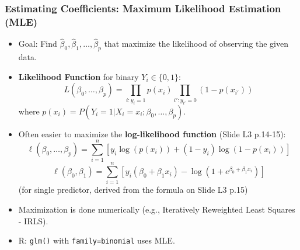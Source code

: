\documentclass[12pt,a4paper]{article}
\newcommand{\Rfunction}[1]{\texttt{#1()}} %
\newcommand{\Rcode}[1]{\texttt{#1}} %
\begin{document}
\begin{itemize}
    \subsubsection{Estimating Coefficients: Maximum Likelihood Estimation (MLE) }
        \begin{itemize}
            \item Goal: Find $\hat{\beta}_0, \hat{\beta}_1, \dots, \hat{\beta}_p$ that maximize the likelihood of observing the given data.
            \item \textbf{Likelihood Function} for binary $Y_i \in \{0,1\}$:
                $$ L(\beta_0, \dots, \beta_p) = \prod_{i: y_i=1} p(x_i) \prod_{i': y_{i'}=0} (1 - p(x_{i'})) $$
                where $p(x_i) = P(Y_i=1 | X_i=x_i; \beta_0, \dots, \beta_p)$.
            \item Often easier to maximize the \textbf{log-likelihood function} (Slide L3 p.14-15):
                $$ \ell(\beta_0, \dots, \beta_p) = \sum_{i=1}^n \left[ y_i \log(p(x_i)) + (1-y_i) \log(1-p(x_i)) \right] $$
                $$ \ell(\beta_0, \beta_1) = \sum_{i=1}^n \left[ y_i (\beta_0 + \beta_1 x_i) - \log(1 + e^{\beta_0 + \beta_1 x_i}) \right] $$ (for single predictor, derived from the formula on Slide L3 p.15)
            \item Maximization is done numerically (e.g., Iteratively Reweighted Least Squares - IRLS).
            \item R: \Rfunction{glm} with \Rcode{family=binomial} uses MLE.
        \end{itemize}


\end{itemize}
\end{document}
